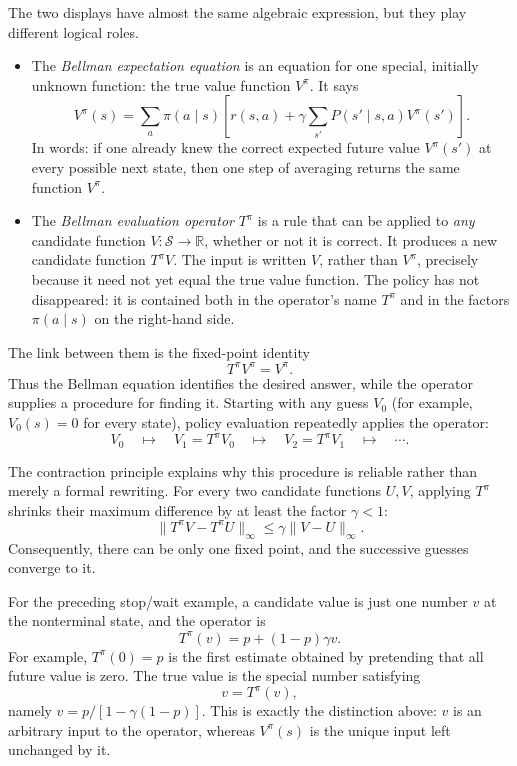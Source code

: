 \documentclass[11pt,a4paper]{article}
\theoremstyle{definition}
\begin{document}
\begin{note}
The two displays have almost the same algebraic expression, but they play different logical
roles.
\begin{itemize}
    \item The \emph{Bellman expectation equation} is an equation for one special, initially
    unknown function: the true value function $V^\pi$. It says
    \[
    V^\pi(s)
    =\sum_a\pi(a\mid s)
    \left[r(s,a)+\gamma\sum_{s'}P(s'\mid s,a)V^\pi(s')\right].
    \]
    In words: if one already knew the correct expected future value $V^\pi(s')$ at every
    possible next state, then one step of averaging returns the same function $V^\pi$.

    \item The \emph{Bellman evaluation operator} $T^\pi$ is a rule that can be applied to
    \emph{any} candidate function $V:\mathcal{S}\to\mathbb{R}$, whether or not it is correct.
    It produces a new candidate function $T^\pi V$. The input is written $V$, rather than
    $V^\pi$, precisely because it need not yet equal the true value function. The policy has
    not disappeared: it is contained both in the operator's name $T^\pi$ and in the factors
    $\pi(a\mid s)$ on the right-hand side.
\end{itemize}

The link between them is the fixed-point identity
\[
T^\pi V^\pi=V^\pi.
\]
Thus the Bellman equation identifies the desired answer, while the operator supplies a
procedure for finding it. Starting with any guess $V_0$ (for example, $V_0(s)=0$ for every
state), policy evaluation repeatedly applies the operator:
\[
V_0
\quad\longmapsto\quad
V_1=T^\pi V_0
\quad\longmapsto\quad
V_2=T^\pi V_1
\quad\longmapsto\quad\cdots.
\]

The contraction principle explains why this procedure is reliable rather than merely a
formal rewriting. For every two candidate functions $U,V$, applying $T^\pi$ shrinks their
maximum difference by at least the factor $\gamma<1$:
\[
\lVert T^\pi V-T^\pi U\rVert_\infty
\leq\gamma\lVert V-U\rVert_\infty.
\]
Consequently, there can be only one fixed point, and the successive guesses converge to it.

For the preceding stop/wait example, a candidate value is just one number $v$ at the
nonterminal state, and the operator is
\[
T^\pi(v)=p+(1-p)\gamma v.
\]
For example, $T^\pi(0)=p$ is the first estimate obtained by pretending that all future value
is zero. The true value is the special number satisfying
\[
v=T^\pi(v),
\]
namely $v=p/[1-\gamma(1-p)]$. This is exactly the distinction above: $v$ is an arbitrary
input to the operator, whereas $V^\pi(s)$ is the unique input left unchanged by it.
\end{note}
\end{document}
